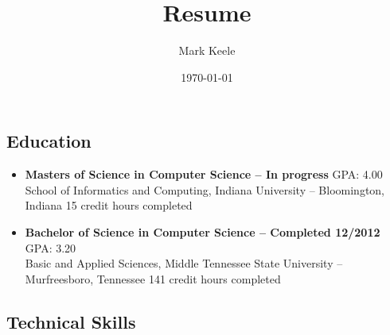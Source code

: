 \documentclass[10pt,letterpaper]{article}
\author{Mark Keele}
\title{Resume}
\date{\today}
\begin{document}


\subsection*{Education}

\begin{itemize}
	\item \textbf{Masters of Science in Computer Science -- In progress}
	\hfill{GPA: 4.00} \\
	School of Informatics and Computing, Indiana University -- Bloomington, Indiana
	\hfill{15 credit hours completed}


	\item \textbf{Bachelor of Science in Computer Science -- Completed 12/2012}
	\hfill{GPA: 3.20 }\\
	Basic and Applied Sciences, Middle Tennessee State University -- Murfreesboro, Tennessee
	\hfill{141 credit hours completed}
\end{itemize}

\subsection*{Technical Skills}
\end{document}

